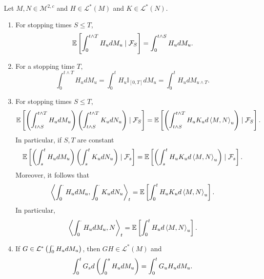 \begin{thm}
    Let $M,N \in \mathcal{M}^{2,c}$ and $H\in \mathcal{L}^*(M)$ and $K\in \mathcal{L}^*(N)$.
    \begin{enumerate}[label=(\arabic{*})]
        \item For stopping times $S \leq T$,
        \begin{equation*}
            \mathbb{E}\left[\int_0^{t \wedge T} H_u dM_u \mid \mathcal{F}_S\right] = \int_0^{t \wedge S} H_u dM_u.
        \end{equation*}

        \item For a stopping time $T$,
        \begin{equation*}
            \int_0^{t \wedge T} H_u dM_u = \int_0^{t} H_u \mathbb{I}_{[0,T]} dM_u = \int_0^{t} H_u dM_{u \wedge T}.
        \end{equation*}

        \item For stopping times $S \leq T$,
        \begin{equation*}
            \mathbb{E}\left[\left(\int_{t \wedge S}^{t \wedge T} H_u dM_u\right)\left(\int_{t \wedge S}^{t \wedge T} K_u dN_u\right) \mid \mathcal{F}_S\right] = \mathbb{E}\left[\left(\int_{t \wedge S}^{t \wedge T} H_uK_u d\left\langle M,N \right\rangle_u\right) \mid \mathcal{F}_S\right].
        \end{equation*}
        In particular, if $S,T$ are constant
        \begin{equation*}
            \mathbb{E}\left[\left(\int_s^t H_u dM_u\right)\left(\int_s^t K_u dN_u\right) \mid \mathcal{F}_s\right] = \mathbb{E}\left[\left(\int_s^t H_uK_u d\left\langle M,N \right\rangle_u\right) \mid \mathcal{F}_s\right].
        \end{equation*}
        Moreover, it follows that
        \begin{equation*}
            \left\langle \int_0^\cdot H_udM_u,\int_0^\cdot K_u dN_u \right\rangle_t = \mathbb{E}\left[\int_0^t H_uK_u d\left\langle M,N \right\rangle_u\right].
        \end{equation*}
        In particular,
        \begin{equation*}
            \left\langle \int_0^\cdot H_udM_u,N \right\rangle_t = \mathbb{E}\left[\int_0^t H_u d\left\langle M,N \right\rangle_u\right].
        \end{equation*}

        \item If $G \in \mathcal{L}^*\left( \int_0^\cdot H_u dM_u \right)$, then $GH \in \mathcal{L}^*(M)$ and
        \begin{equation*}
            \int_0^t G_s d\left(\int_0^s H_u dM_u\right) = \int_0^tG_uH_u dM_u.
        \end{equation*}
    \end{enumerate}
\end{thm}

